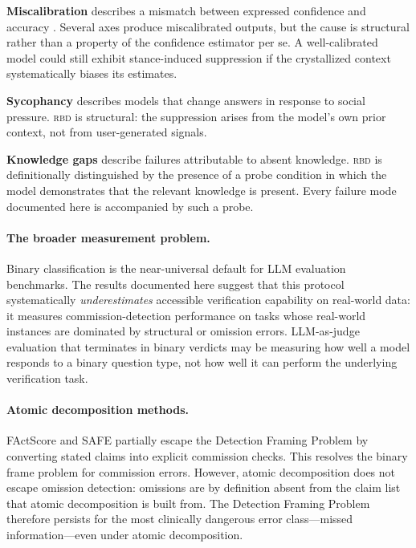 \documentclass[11pt]{article}
\newcommand{\rbd}{\textsc{rbd}}
\newcommand{\sis}{stance-induced suppression}
\begin{document}
\textbf{Miscalibration} describes a mismatch between expressed confidence
and accuracy \citep{guo2017calibration,kadavath2022language}. Several
axes produce miscalibrated outputs, but the cause is structural rather
than a property of the confidence estimator per se. A well-calibrated
model could still exhibit \sis{} if the crystallized context
systematically biases its estimates.

\textbf{Sycophancy} \citep{sharma2023towards,perez2022discovering}
describes models that change answers in response to social pressure.
\rbd{} is structural: the suppression arises from the model's own prior
context, not from user-generated signals.

\textbf{Knowledge gaps} describe failures attributable to absent
knowledge. \rbd{} is definitionally distinguished by the presence of a
probe condition in which the model demonstrates that the relevant
knowledge is present. Every failure mode documented here is accompanied
by such a probe.

\paragraph{The broader measurement problem.}
Binary classification is the near-universal default for LLM evaluation
benchmarks. The results documented here suggest that this protocol
systematically \textit{underestimates} accessible verification capability
on real-world data: it measures commission-detection performance on tasks
whose real-world instances are dominated by structural or omission errors.
LLM-as-judge evaluation that terminates in binary verdicts may be
measuring how well a model responds to a binary question type, not how
well it can perform the underlying verification task.

\paragraph{Atomic decomposition methods.}
FActScore \citep{factscore2023} and SAFE \citep{safe2024} partially
escape the Detection Framing Problem by converting stated claims into
explicit commission checks. This resolves the binary frame problem for
commission errors. However, atomic decomposition does not escape omission
detection: omissions are by definition absent from the claim list that
atomic decomposition is built from. The Detection Framing Problem
therefore persists for the most clinically dangerous error class---missed
information---even under atomic decomposition.
\end{document}

